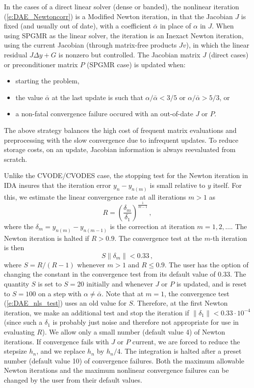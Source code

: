 In the cases of a direct linear solver (dense or banded), the nonlinear 
iteration (\ref{e:DAE_Newtoncorr}) is a Modified Newton iteration, in
that the Jacobian $J$ is fixed (and usually out of date), with
a coefficient $\bar\alpha$ in place of $\alpha$ in $J$. When using
SPGMR as the linear solver, the iteration is an Inexact Newton iteration,
using the current Jacobian (through matrix-free products $Jv$), in 
which the linear residual $J\Delta y + G$ is nonzero but controlled.
The Jacobian matrix $J$ (direct cases) or preconditioner matrix $P$ 
(SPGMR case) is updated when:
\begin{itemize}
\item starting the problem,
\item the value $\bar\alpha$ at the last update is such that
  $\alpha / {\bar\alpha} < 3/5$ or $\alpha / {\bar\alpha} > 5/3$, or
\item a non-fatal convergence failure occured with an out-of-date $J$ or $P$.
\end{itemize}
The above strategy balances the high cost of frequent matrix evaluations
and preprocessing with the slow convergence due to infrequent updates.
To reduce storage costs, on an update, Jacobian information is always
reevaluated from scratch.

Unlike the CVODE/CVODES case, the stopping test for the Newton iteration
in IDA insures that the iteration error $y_n - y_{n(m)}$ is small relative
to $y$ itself. For this, we estimate the linear convergence rate at all 
iterations $m>1$ as
\begin{equation*}
R = \left( \frac{\delta_m}{\delta_1} \right)^{\frac{1}{m-1}} \, , 
\end{equation*}
where the $\delta_m = y_{n(m)} - y_{n(m-1)}$ is the correction at
iteration $m=1,2,\ldots$. The Newton iteration is halted if $R>0.9$.
The convergence test at the $m$-th iteration is then
\begin{equation}\label{e:DAE_nls_test}
S \| \delta_m \| < 0.33 \, ,
\end{equation}
where $S = R/(R-1)$ whenever $m>1$ and $R\le 0.9$. The user has the
option of changing the constant in the convergence test from its default 
value of $0.33$.
%
The quantity $S$ is set to $S=20$ initially and whenever $J$ or $P$ is
updated, and is reset to $S=100$ on a step with $\alpha \neq \bar\alpha$.
Note that at $m=1$, the convergence test (\ref{e:DAE_nls_test}) uses an old 
value for $S$. Therefore, at the first Newton iteration, we make an additional
test and stop the iteration if $\|\delta_1\| < 0.33 \cdot 10^{-4}$
(since such a $\delta_1$ is probably just noise and therefore not appropriate 
for use in evaluating $R$).
%
We allow only a small number (default value 4) of Newton iterations.
If convergence fails with $J$ or $P$ current, 
we are forced to reduce the stepsize $h_n$, and we replace $h_n$ by $h_n/4$.
The integration is halted after a preset number (default value 10)
of convergence failures. Both the maximum allowable Newton iterations
and the maximum nonlinear convergence failures can be changed by the user
from their default values.

